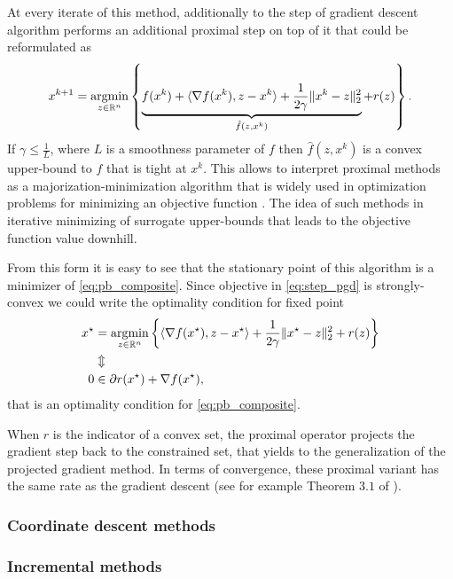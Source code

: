 At every iterate of this method, additionally to the step of gradient descent algorithm performs an additional proximal step on top of it that could be reformulated as
\begin{equation}\label{eq:step_pgd}
x^{k+1} = \operatorname*{argmin}_{z\in\mathbb{R}^n}\left\{\underbrace{f(x^k) + \langle\nabla f(x^k), z-x^k\rangle+\frac{1}{2\gamma}\|x^k-z\|_2^2}_{\hat{f}(z, x^k)} + r(z)\right\}.
\end{equation}
If $\gamma\leq \frac{1}{L}$, where $L$ is a smoothness parameter of $f$ then $\hat{f}(z, x^k)$ is a convex upper-bound to $f$ that is tight at $x^k$. This allows to interpret proximal methods as a majorization-minimization algorithm \cite{lange2000optimization} {\color{blue} that is widely used in optimization problems for minimizing an objective function \cite{cappe2009line, neal1998view,gasso2009recovering,wright2009sparse,mairal2015incremental}. The idea of such methods in iterative minimizing of surrogate upper-bounds that leads to the objective function value downhill.}

From this form it is easy to see that the stationary point of this algorithm is a minimizer of \eqref{eq:pb_composite}. Since objective in \eqref{eq:step_pgd} is strongly-convex we could write the optimality condition for fixed point
\begin{align*}
x^\star &= \operatorname*{argmin}_{z\in\mathbb{R}^n}\left\{\langle\nabla f(x^\star), z-x^\star\rangle+\frac{1}{2\gamma}\|x^\star-z\|_2^2 + r(z)\right\}\\
&\Updownarrow\\
0&\in \partial r(x^\star) + \nabla f(x^\star),
\end{align*}
that is an optimality condition for \eqref{eq:pb_composite}.

When $r$ is the indicator of a convex set, the proximal operator projects the gradient step back to the constrained set, that yields to the generalization of the projected gradient method. In terms of convergence, these proximal variant has the same rate as the gradient descent (see for example Theorem $3.1$ of \cite{beck2009fast}).

\subsubsection{Coordinate descent methods}


\subsubsection{Incremental methods}
